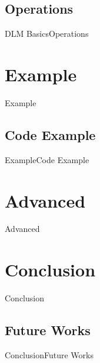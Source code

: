 \documentclass[10pt]{beamer}
\begin{document}
\subsection{Operations}
\begin{frame}{DLM Basics}{Operations}
\end{frame}

\section{Example}
\begin{frame}{Example}{}
\end{frame}

\subsection{Code Example}
\begin{frame}{Example}{Code Example}
\end{frame}

\section{Advanced}
\begin{frame}{Advanced}{}
\end{frame}

\section{Conclusion}
\begin{frame}{Conclusion}{}
\end{frame}

\subsection{Future Works}
\begin{frame}{Conclusion}{Future Works}
\end{frame}

{\aauwavesbg
\begin{frame}
\end{frame}}
\end{document}

